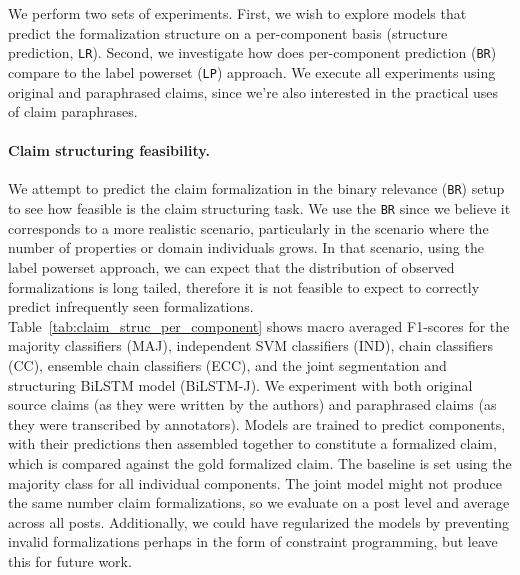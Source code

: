 



We perform two sets of experiments. First, we wish to explore models
that predict the formalization structure on a per-component basis (structure
prediction, \texttt{LR}). 
Second, we investigate how does per-component prediction (\texttt{BR}) compare to 
the label powerset (\texttt{LP}) approach.
We execute all experiments using original and paraphrased claims, since we're
also interested in the practical uses of claim paraphrases.

\paragraph{Claim structuring feasibility. }
We attempt to predict the claim formalization in the binary
relevance (\texttt{BR}) setup to see how feasible is the claim 
structuring task. We use the \texttt{BR} since we believe it corresponds
to a more realistic scenario, particularly in the scenario where the number
of properties or domain individuals grows. In that scenario, using the
label powerset approach, we can expect that the
distribution of observed formalizations is long tailed, therefore it is not
feasible to expect to correctly predict infrequently seen formalizations.
Table~\ref{tab:claim_struc_per_component} shows macro averaged F1-scores for
the majority classifiers (MAJ), independent SVM classifiers (IND), chain
classifiers (CC), ensemble chain classifiers (ECC), and the joint segmentation
and structuring BiLSTM model (BiLSTM-J).  We experiment with both original
source claims (as they were written by the authors) and paraphrased claims (as
they were transcribed by annotators).
Models are trained to predict components, with their predictions then assembled
together to constitute a formalized claim, which is compared against the gold
formalized claim.  The baseline is set using the majority 
class for all individual components. 
The joint model might not produce the same number claim formalizations, 
so we evaluate on a post level and average across all posts. 
Additionally, we could have regularized the models by preventing invalid
formalizations perhaps in the form of constraint programming, but leave this
for future work. 

